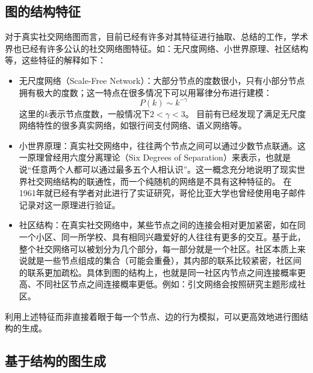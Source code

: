 \subsection{图的结构特征}

对于真实社交网络图而言，目前已经有许多对其特征进行抽取、总结的工作，学术界也已经有许多公认的社交网络图特征。如：无尺度网络\cite{onnela2007structure}、小世界原理\cite{watts1998collective}、社区结构\cite{girvan2002community}等，这些特征的解释如下：

\begin{itemize}
    \item 无尺度网络（Scale-Free Network）：大部分节点的度数很小，只有小部分节点拥有极大的度数；这一特点在很多情况下可以用幂律分布进行建模：
    \begin{equation}
    \label{equ:powerlaw}
    P(k) \sim k^{-\gamma}
    \end{equation}
    这里的$k$表示节点度数，一般情况下$2<\gamma<3$。
    目前有已经发现了满足无尺度网络特性的很多真实网络，如银行间支付网络\cite{Interbank}、语义网络\cite{Steyvers2010The}等。
    \item 小世界原理：真实社交网络中，往往两个节点之间可以通过少数节点联通。这一原理曾经用六度分离理论（Six Degrees of Separation）来表示，也就是说“任意两个人都可以通过最多五个人相认识”。这一概念充分地说明了现实世界社交网络结构的联通性，而一个纯随机的网络是不具有这种特征的。
    在1961年就已经有学者对此进行了实证研究\cite{Gurevitch1961The}，哥伦比亚大学也曾经使用电子邮件记录对这一原理进行验证\cite{Dodds827}。
    \item 社区结构：在真实社交网络中，某些节点之间的连接会相对更加紧密，如在同一个小区、同一所学校、具有相同兴趣爱好的人往往有更多的交互。基于此，整个社交网络可以被划分为几个部分，每一部分就是一个社区。社区本质上来说就是一些节点组成的集合（可能会重叠\cite{palla2005uncovering}），其内部的联系比较紧密，社区间的联系更加疏松。具体到图的结构上，也就是同一社区内节点之间连接概率更高、不同社区节点之间连接概率更低。例如：引文网络会按照研究主题形成社区\cite{Michelle2002Girvan}。
\end{itemize}

\vspace{0.2cm}

利用上述特征而非直接着眼于每一个节点、边的行为模拟，可以更高效地进行图结构的生成。

\subsection{基于结构的图生成}
\label{cap:simplegen}

